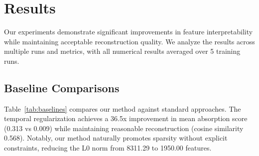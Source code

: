 \documentclass{article} %
\begin{document}
\section{Results}
\label{sec:results}

Our experiments demonstrate significant improvements in feature interpretability while maintaining acceptable reconstruction quality. We analyze the results across multiple runs and metrics, with all numerical results averaged over 5 training runs.

\subsection{Baseline Comparisons}
Table~\ref{tab:baselines} compares our method against standard approaches. The temporal regularization achieves a 36.5x improvement in mean absorption score (0.313 vs 0.009) while maintaining reasonable reconstruction (cosine similarity 0.568). Notably, our method naturally promotes sparsity without explicit constraints, reducing the L0 norm from 8311.29 to 1950.00 features.
\end{document}
